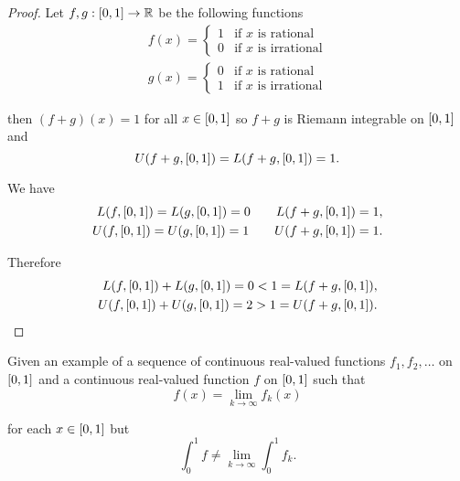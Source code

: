 \begin{proof}
    Let $f, g: \left[{0, 1}\right]\to\mathbb{R}$ be the following functions
    \[
        \begin{split}
            f(x) = \begin{cases}
                       1 & \text{if $x$ is rational}   \\
                       0 & \text{if $x$ is irrational}
                   \end{cases} \\
            g(x) = \begin{cases}
                       0 & \text{if $x$ is rational}   \\
                       1 & \text{if $x$ is irrational}
                   \end{cases}
        \end{split}
    \]

    then $(f + g)(x) = 1$ for all $x\in\left[{0, 1}\right]$ so $f + g$ is Riemann integrable on $\left[{0, 1}\right]$ and
    \[
        U(f + g, \left[{0, 1}\right]) = L(f + g, \left[{0, 1}\right]) = 1.
    \]

    We have
    \[
        \begin{split}
            L(f, \left[{0, 1}\right]) = L(g, \left[{0, 1}\right]) = 0 \qquad L(f + g, \left[{0, 1}\right]) = 1, \\
            U(f, \left[{0, 1}\right]) = U(g, \left[{0, 1}\right]) = 1 \qquad U(f + g, \left[{0, 1}\right]) = 1.
        \end{split}
    \]

    Therefore
    \[
        \begin{split}
            L(f, \left[{0, 1}\right]) + L(g, \left[{0, 1}\right]) = 0 < 1 = L(f + g, \left[{0, 1}\right]), \\
            U(f, \left[{0, 1}\right]) + U(g, \left[{0, 1}\right]) = 2 > 1 = U(f + g, \left[{0, 1}\right]).
        \end{split}
    \]
\end{proof}
\newpage

\begin{exercise}\label{chapter1:sectionB:exercise5}
    Given an example of a sequence of continuous real-valued functions $f_{1}, f_{2}, \ldots$ on $\left[{0, 1}\right]$ and a continuous real-valued function $f$ on $\left[{0, 1}\right]$ such that
    \[
        f(x) = \lim\limits_{k\to\infty}f_{k}(x)
    \]

    for each $x\in\left[{0,1}\right]$ but
    \[
        \int^{1}_{0}f \ne \lim\limits_{k\to\infty}\int^{1}_{0}f_{k}.
    \]
\end{exercise}

